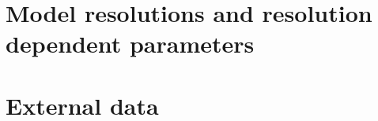 \documentclass[DIV14,BCOR1cm,11pt,a4paper,twoside]{scrreprt}
\begin{document}




\chapter{Model resolutions and resolution dependent parameters}
%

\chapter{External data}

%

%


%

%


%
\end{document}
